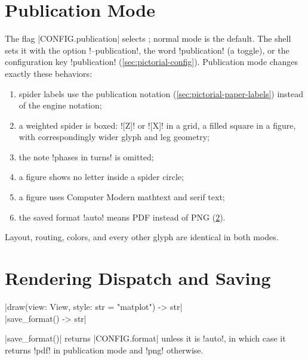 {\section{Publication Mode}\label{sec:pictorial-publication}

The flag \py|CONFIG.publication| selects ; normal mode is the default.
The shell sets it with the option \code!--publication!, the word \code!publication! (a toggle),
or the configuration key \code!publication! (\cref{sec:pictorial-config}). Publication mode
changes exactly these behaviors:
\begin{enumerate}
  \item spider labels use the publication notation (\cref{sec:pictorial-paper-labels}) instead
    of the engine notation;
  \item a weighted spider is boxed: \code![Z]! or \code![X]! in a grid, a filled square in a
    figure, with correspondingly wider glyph and leg geometry;
  \item the note \code!phases in turns! is omitted;
  \item a figure shows no letter inside a spider circle;
  \item a figure uses Computer Modern mathtext and serif text;
  \item the saved format \code!auto! means PDF instead of PNG (\cref{sec:pictorial-draw}).
\end{enumerate}
Layout, routing, colors, and every other glyph are identical in both modes.

\section{Rendering Dispatch and Saving}\label{sec:pictorial-draw}

\begin{signature}
\py|draw(view: View, style: str = "matplot") -> str|\\
\py|save_format() -> str|
\end{signature}

\py|save_format()| returns \py|CONFIG.format| unless it is \code!auto!, in which case it returns
\code!pdf! in publication mode and \code!png! otherwise.

}
